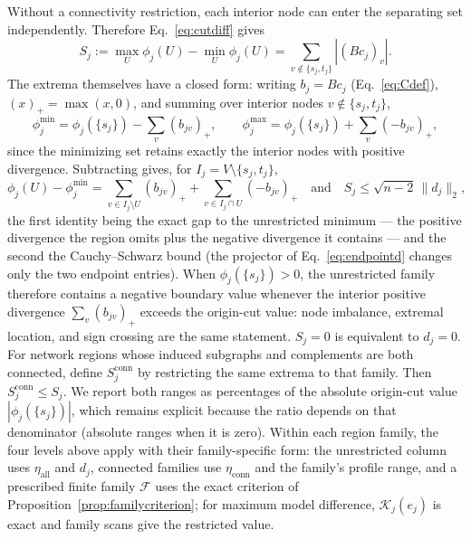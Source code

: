 \documentclass[a4paper,fleqn]{cas-sc}
\newcommand{\norm}[1]{\lVert #1 \rVert}
\begin{document}
Without a connectivity restriction, each interior node can enter the
separating set independently. Therefore Eq.~\eqref{eq:cutdiff} gives
\begin{equation}
S_j:=\max_U\phi_j(U)-\min_U\phi_j(U)
=\sum_{v\notin\{s_j,t_j\}}|(Bc_j)_v|.
\label{eq:cutspread}
\end{equation}
The extrema themselves have a closed form: writing $b_j=Bc_j$
(Eq.~\eqref{eq:Cdef}), $(x)_+=\max(x,0)$, and summing over interior nodes
$v\notin\{s_j,t_j\}$,
\begin{equation}
\phi_j^{\min}=\phi_j(\{s_j\})-\sum_v(b_{jv})_+,
\qquad
\phi_j^{\max}=\phi_j(\{s_j\})+\sum_v(-b_{jv})_+,
\label{eq:cutextrema}
\end{equation}
since the minimizing set retains exactly the interior nodes with
positive divergence. Subtracting gives, for $I_j=V\setminus\{s_j,t_j\}$,
\begin{equation}
\phi_j(U)-\phi_j^{\min}
=\sum_{v\in I_j\setminus U}(b_{jv})_+
+\sum_{v\in I_j\cap U}(-b_{jv})_+
\quad\text{and}\quad
S_j\le\sqrt{n-2}\,\norm{d_j}_2,
\label{eq:cutgap}
\end{equation}
the first identity being the exact gap to the unrestricted minimum ---
the positive divergence the region omits plus the negative divergence
it contains --- and the second the Cauchy--Schwarz bound (the
projector of Eq.~\eqref{eq:endpointd} changes only the two endpoint
entries). When
$\phi_j(\{s_j\})>0$, the unrestricted family
therefore contains a negative boundary value whenever the interior positive
divergence $\sum_v(b_{jv})_+$ exceeds the origin-cut value: node
imbalance, extremal location, and sign crossing are the same statement.
$S_j=0$ is equivalent to $d_j=0$.
For network regions whose induced subgraphs and complements are both
connected, define $S_j^{\mathrm{conn}}$ by restricting the same extrema to
that family. Then $S_j^{\mathrm{conn}}\le S_j$. We report both
ranges as percentages of the absolute origin-cut value
$|\phi_j(\{s_j\})|$, which remains explicit because the ratio depends
on that denominator (absolute ranges when it is zero). Within each
region family, the four levels above apply with
their family-specific form: the unrestricted column uses
$\eta_{\mathrm{all}}$ and $d_j$, connected families use
$\eta_{\mathrm{conn}}$ and the family's profile range, and a
prescribed finite family $\mathcal F$ uses the exact criterion of
Proposition~\ref{prop:familycriterion}; for
maximum model difference, $\mathcal K_j(e_j)$ is exact and family
scans give the restricted value.
\end{document}
